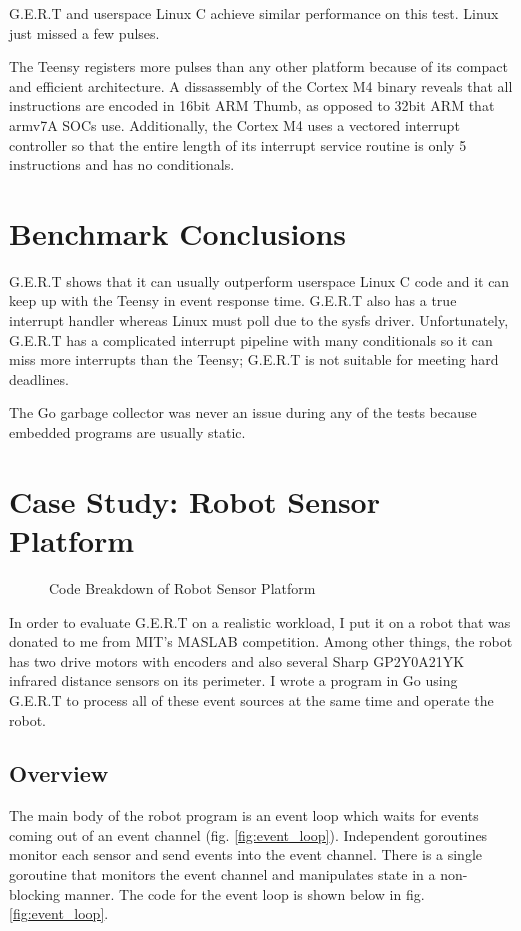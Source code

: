 G.E.R.T and userspace Linux C achieve similar performance on this test.
Linux just missed a few pulses.

The Teensy registers more pulses than any other platform because of its
compact and efficient architecture. A dissassembly of the Cortex M4 binary
reveals that all instructions are encoded in 16bit ARM Thumb, as opposed to
32bit ARM that armv7A SOCs use. Additionally, the Cortex M4 uses a vectored
interrupt controller so that the entire length of its interrupt service routine
is only 5 instructions and has no conditionals.

\section{Benchmark Conclusions}

G.E.R.T shows that it can usually outperform userspace Linux C code and it
can keep up with the Teensy in event response time. G.E.R.T also has a true interrupt
handler whereas Linux must poll due to the sysfs driver. Unfortunately, G.E.R.T
has a complicated interrupt pipeline with many conditionals so it can miss
more interrupts than the Teensy; G.E.R.T is not suitable for meeting hard deadlines.

The Go garbage collector was never an issue during any of the tests because embedded
programs are usually static.

\section{Case Study: Robot Sensor Platform} \label{sec:robot}

\begin{figure}[h]
  \begin{center}
 \end{center}
  \caption{Code Breakdown of Robot Sensor Platform} \label{fig:robot_code}
\end{figure}

In order to evaluate G.E.R.T on a realistic workload, I put it on a robot that was
donated to me from MIT's MASLAB competition. Among other things, the robot has two drive
motors with encoders and also several Sharp GP2Y0A21YK infrared distance sensors on its perimeter.
I wrote a program in Go using G.E.R.T to process all of these event sources at the same time
and operate the robot.

\subsection{Overview}
The main body of the robot program is an event loop which waits for events coming out of an event channel (fig. \ref{fig:event_loop}).
Independent goroutines monitor each sensor and send events into the event channel. There is a
single goroutine that monitors the event channel and manipulates state in a non-blocking manner. The code for the
event loop is shown below in fig. \ref{fig:event_loop}.

